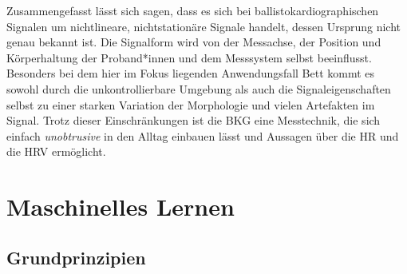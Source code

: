 	
	Zusammengefasst lässt sich sagen, dass es sich bei ballistokardiographischen Signalen um nichtlineare, nichtstationäre Signale handelt, dessen Ursprung nicht genau bekannt ist. Die Signalform wird von der Messachse, der Position und Körperhaltung der Proband*innen und dem Messsystem selbst beeinflusst. Besonders bei dem hier im Fokus liegenden Anwendungsfall Bett kommt es sowohl durch die unkontrollierbare Umgebung als auch die Signaleigenschaften selbst zu einer starken Variation der Morphologie und vielen Artefakten im Signal. Trotz dieser Einschränkungen ist die \acl{BKG} eine Messtechnik, die sich einfach \textit{unobtrusive} in den Alltag einbauen lässt und Aussagen über die \acl{HR} und die \acl{HRV} ermöglicht.

	

\section{Maschinelles Lernen}

	\subsection{Grundprinzipien}
	
